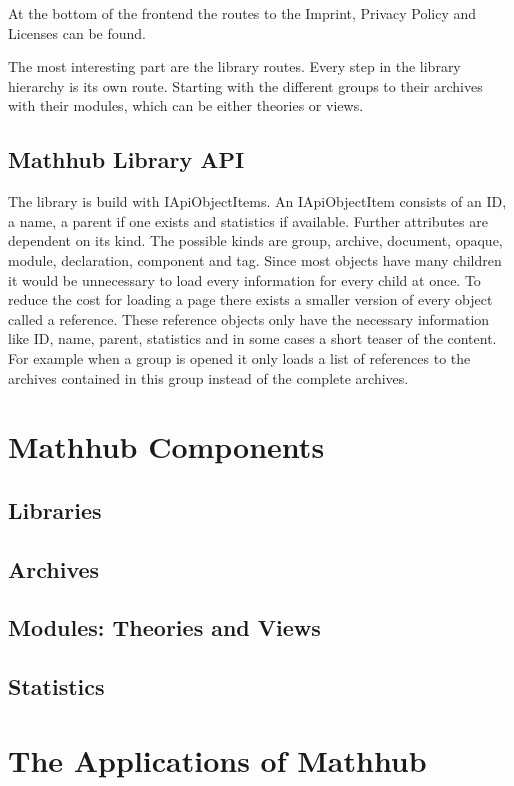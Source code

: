 \documentclass[11pt,a4paper]{article}
\begin{document}
At the bottom of the frontend the routes to the Imprint, Privacy Policy and Licenses can be found.

The most interesting part are the library routes. Every step in the library hierarchy is its own route. Starting with the different groups to their archives with their modules, which can be either theories or views. 
\subsection{Mathhub Library API}
The library is build with IApiObjectItems. An IApiObjectItem consists of an ID, a name, a parent if one exists and statistics if available. Further attributes are dependent on its kind. The possible kinds are group, archive, document, opaque, module, declaration, component and tag.  Since most objects have many children it would be unnecessary to load every information for every child at once. To reduce the cost for loading a page there exists a smaller version of every object called a reference. These reference objects only have the necessary information like ID, name, parent, statistics and in some cases a short teaser of the content. For example when a group is opened it only loads a list of references to the archives contained in this group instead of the complete archives.

\section{Mathhub Components}
	\subsection{Libraries}
	\subsection{Archives}
	\subsection{Modules: Theories and Views}
	\subsection{Statistics}

\section{The Applications of Mathhub}
\end{document}
